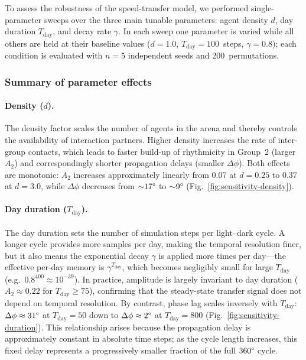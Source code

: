 \documentclass{article}
\newcommand{\added}[1]{{\color{blue}#1}}
\newcommand{\added}[1]{#1}
\begin{document}
\added{To assess the robustness of the speed-transfer model, we performed single-parameter sweeps over the three main tunable parameters: agent density $d$, day duration $T_{\mathrm{day}}$, and decay rate $\gamma$.  In each sweep one parameter is varied while all others are held at their baseline values ($d{=}1.0$, $T_{\mathrm{day}}{=}100$~steps, $\gamma{=}0.8$); each condition is evaluated with $n{=}5$ independent seeds and 200~permutations.}

\subsubsection*{\added{Summary of parameter effects}}

\paragraph{Density ($d$).}
\added{The density factor scales the number of agents in the arena and thereby controls the availability of interaction partners.  Higher density increases the rate of inter-group contacts, which leads to faster build-up of rhythmicity in Group~2 (larger $A_2$) and correspondingly shorter propagation delays (smaller $\Delta\phi$).  Both effects are monotonic: $A_2$ increases approximately linearly from $0.07$ at $d{=}0.25$ to $0.37$ at $d{=}3.0$, while $\Delta\phi$ decreases from ${\sim}17\text{\textdegree}$ to ${\sim}9\text{\textdegree}$ (Fig.~\ref{fig:sensitivity-density}).}

\paragraph{Day duration ($T_{\mathrm{day}}$).}
\added{The day duration sets the number of simulation steps per light--dark cycle.  A longer cycle provides more samples per day, making the temporal resolution finer, but it also means the exponential decay $\gamma$ is applied more times per day---the effective per-day memory is $\gamma^{T_{\mathrm{day}}}$, which becomes negligibly small for large $T_{\mathrm{day}}$ (e.g.\ $0.8^{400}\!\approx\!10^{-39}$).  In practice, amplitude is largely invariant to day duration ($A_2 \approx 0.22$ for $T_{\mathrm{day}} \geq 75$), confirming that the steady-state transfer signal does not depend on temporal resolution.  By contrast, phase lag scales inversely with $T_{\mathrm{day}}$: $\Delta\phi \approx 31\text{\textdegree}$ at $T_{\mathrm{day}}{=}50$ down to $\Delta\phi \approx 2\text{\textdegree}$ at $T_{\mathrm{day}}{=}800$ (Fig.~\ref{fig:sensitivity-duration}).  This relationship arises because the propagation delay is approximately constant in absolute time steps; as the cycle length increases, this fixed delay represents a progressively smaller fraction of the full $360\text{\textdegree}$ cycle.}
\end{document}
